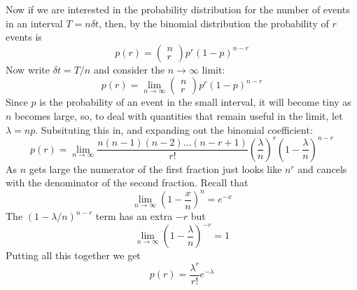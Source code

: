 \documentclass[11pt,a4paper]{scrartcl}
\begin{document}
Now if we are interested in the probability distribution for the
number of events in an interval $T=n\delta t$, then, by the binomial
distribution the probability of $r$ events is
\begin{equation}
p(r)=\left(\begin{array}{c}n\\r\end{array}\right)p^r(1-p)^{n-r}
\end{equation}
Now write $\delta t=T/n$ and consider the $n\rightarrow \infty$ limit:
\begin{equation}
p(r)=\lim_{n\rightarrow\infty}\left(\begin{array}{c}n\\r\end{array}\right)p^r(1-p)^{n-r}
\end{equation}
Since $p$ is the probability of an event in the small interval, it
will become tiny as $n$ becomes large, so, to deal with quantities
that remain useful in the limit, let $\lambda=np$. Subsituting this
in, and expanding out the binomial coefficient:
\begin{equation}
p(r)=\lim_{n\rightarrow\infty}\frac{n(n-1)(n-2)\ldots (n-r+1)}{r!}\left(\frac{\lambda}{n}\right)^r\left(1-\frac{\lambda}{n}\right)^{n-r}
\end{equation}
As $n$ gets large the numerator of the first fraction just looks like $n^r$ and cancels with the denominator of the second fraction. Recall that
\begin{equation}
\lim_{n\rightarrow \infty}\left(1-\frac{x}{n}\right)^n=e^{-x}
\end{equation}
The $(1-\lambda/n)^{n-r}$ term has an extra $-r$ but
\begin{equation}
\lim_{n\rightarrow \infty}\left(1-\frac{\lambda}{n}\right)^{-r}=1
\end{equation}
Putting all this together we get
\begin{equation}
p(r)=\frac{\lambda^r}{r!}e^{-\lambda}
\end{equation}
\end{document}
